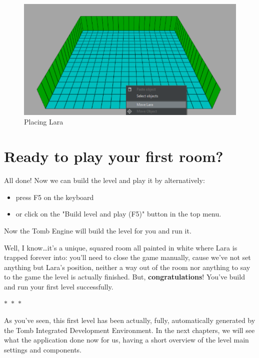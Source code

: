 \begin{figure}
    \centering
     \includegraphics[width=1\textwidth]{screenshots/1001.png}
     \caption{Placing Lara}
     \label{fig:temovelara} 
\end{figure}

\section{Ready to play your first room?}
All done! Now we can build the level and play it by alternatively:
\begin{itemize}
    \item press F5 on the keyboard
    \item or click on the "Build level and play (F5)" button in the top menu.
\end{itemize}
Now the Tomb Engine will build the level for you and run it.
\par Well, I know\dots it's a unique, squared room all painted in white where Lara is trapped forever into: you'll need to close the game manually, cause we've not set anything but Lara's position, neither a way out of the room nor anything to say to the game the level is actually finished. But, \textbf{congratulations}! You've build and run your first level successfully.
\begin{center}
  $\ast$~$\ast$~$\ast$
\end{center}

\par As you've seen, this first level has been actually, fully, automatically generated by the Tomb Integrated Development Environment. In the next chapters, we will see what the application done now for us, having a short overview of the level main settings and components.

